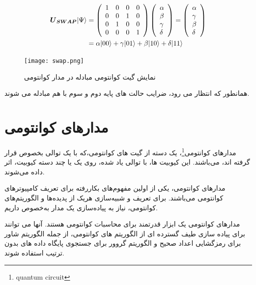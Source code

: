 \documentclass{book}
\begin{document}
\begin{center}
	$$\begin{aligned}
		\boldsymbol{U}_{\boldsymbol{SWAP}}|\Psi\rangle & =\left(\begin{array}{llll}
			1 & 0 & 0 & 0 \\
			0 & 0 & 1 & 0 \\
			0 & 1 & 0 & 0 \\
			0 & 0 & 0 & 1
		\end{array}\right)\left(\begin{array}{l}
			\alpha \\
			\beta \\
			\gamma \\
			\delta
		\end{array}\right)=\left(\begin{array}{l}
			\alpha \\
			\gamma \\
			\beta \\
			\delta
		\end{array}\right) \\
		\vspace{2cm}
		& =\alpha|00\rangle+\gamma|01\rangle+\beta|10\rangle+\delta|11\rangle
	\end{aligned}$$
\end{center}





\begin{figure}[ht]
	\centering
	\texttt{[image: swap.png]}
	\caption{نمایش گیت کوانتومی مبادله در مدار کوانتومی}
	\label{SWAP}
\end{figure}



همانطور که انتظار می رود، ضرایب حالت های پایه دوم و سوم با هم مبادله می شوند.
\section{مدار‌های کوانتومی}
مدار‌های ‌کوانتومی\footnote{quantum circuit}، یک دسته از گیت ها‌ی کوانتومی،که با یک توالی بخصوص قرار گرفته اند، ‌می‌باشند. این کیوبیت ها، با توالی یاد شده، روی یک یا چند دسته کیوبیت، اثر داده ‌می‌شوند. 

مدار‌های کوانتومی، یکی از اولین مفهوم‌های بکار‌رفته برای تعریف کامپیوتر‌های کوانتومی‌ می‌باشند. برای تعریف و شبیه‌سازی هریک از پدیده‌ها و الگوریتم‌های کوانتومی، نیاز به پیاده‌سازی یک مدار به‌خصوص داریم.


مدارهای کوانتومی یک ابزار قدرتمند برای محاسبات کوانتومی هستند. آنها می توانند برای پیاده سازی طیف گسترده ای از الگوریتم های کوانتومی، از جمله الگوریتم شاور برای رمزگشایی اعداد صحیح و الگوریتم گروور برای جستجوی پایگاه داده های بدون ترتیب استفاده شوند.
\end{document}
